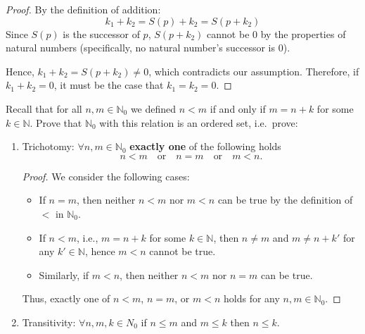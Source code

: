 \documentclass[10pt]{article}
\newcommand{\N}{\mathbb{N}}
\newenvironment{problem}[2][Problem]{\begin{trivlist}
\item[\hskip \labelsep {\bfseries #1}\hskip \labelsep {\bfseries #2.}]}{\end{trivlist}}
\begin{document}
\begin{problem}{2}
\begin{enumerate}
\begin{proof}
                    By the definition of addition:
                    \[ k_1 + k_2 = S(p) + k_2 = S(p + k_2) \]
                    Since \( S(p) \) is the successor of \( p \), \( S(p + k_2) \) cannot be 0 by the properties of natural numbers (specifically, no natural number's successor is 0).

                    Hence, \( k_1 + k_2 = S(p + k_2) \neq 0 \), which contradicts our assumption. Therefore, if \( k_1 + k_2 = 0 \), it must be the case that \( k_1 = k_2 = 0 \).
                \end{proof}


	\end{enumerate}
\end{problem}

\newpage
\begin{problem}{3}
	Recall that for all $ n,m \in \N_0 $ we defined $ n < m $ if and only if $ m=n+k $ for some $ k \in \N $.
	Prove that $ \N_0 $ with this relation is an ordered set, i.e.~prove:
	\begin{enumerate}
		\item Trichotomy: $ \forall n,m \in \N_0 $ \textbf{exactly one} of the following holds
		\[ n<m \quad \text{or}\quad n=m \quad \text{or}\quad m<n. \]

        \begin{proof}
            We consider the following cases:
            \begin{itemize}
                \item If \( n = m \), then neither \( n < m \) nor \( m < n \) can be true by the definition of \( < \) in \( \mathbb{N}_0 \).
                \item If \( n < m \), i.e., \( m = n + k \) for some \( k \in \mathbb{N} \), then \( n \neq m \) and \( m \neq n + k' \) for any \( k' \in \mathbb{N} \), hence \( m < n \) cannot be true.
                \item Similarly, if \( m < n \), then neither \( n < m \) nor \( n = m \) can be true.
            \end{itemize}

            Thus, exactly one of \( n < m \), \( n = m \), or \( m < n \) holds for any \( n, m \in \mathbb{N}_0 \).
        \end{proof}

		\item Transitivity: $ \forall n,m,k \in N_0 $ if $ n \leq m $ and $ m \leq k $ then $ n \leq k $.


\end{enumerate}
\end{problem}
\end{document}
